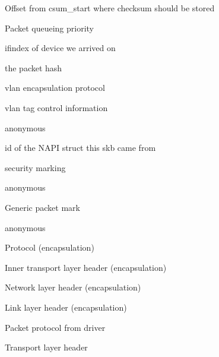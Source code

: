\documentclass[a4paper,8pt,english]{sphinxmanual}
\begin{document}
\begin{description}
\item[{}] \leavevmode
Offset from csum\_start where checksum should be stored

\item[{}] \leavevmode
Packet queueing priority

\item[{}] \leavevmode
ifindex of device we arrived on

\item[{}] \leavevmode
the packet hash

\item[{}] \leavevmode
vlan encapsulation protocol

\item[{}] \leavevmode
vlan tag control information

\item[{}] \leavevmode
anonymous

\item[{}] \leavevmode
id of the NAPI struct this skb came from

\item[{}] \leavevmode
security marking

\item[{}] \leavevmode
anonymous

\item[{}] \leavevmode
Generic packet mark

\item[{}] \leavevmode
anonymous

\item[{}] \leavevmode
Protocol (encapsulation)

\item[{}] \leavevmode
Inner transport layer header (encapsulation)

\item[{}] \leavevmode
Network layer header (encapsulation)

\item[{}] \leavevmode
Link layer header (encapsulation)

\item[{}] \leavevmode
Packet protocol from driver

\item[{}] \leavevmode
Transport layer header


\end{description}
\end{document}
